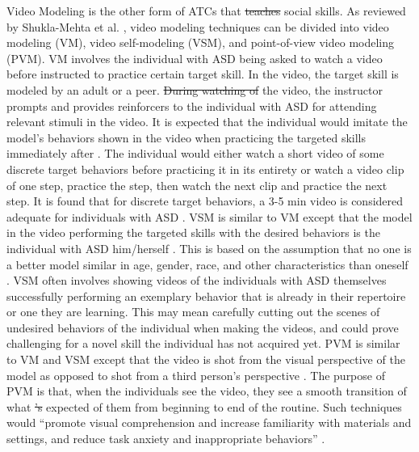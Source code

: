 \documentclass{ut-thesis}
\providecommand{\DIFaddtex}[1]{{\protect\color{blue}\uwave{#1}}} %
\providecommand{\DIFdeltex}[1]{{\protect\color{red}\sout{#1}}}                      %
\providecommand{\DIFaddbegin}{} %
\providecommand{\DIFaddend}{} %
\providecommand{\DIFdelbegin}{} %
\providecommand{\DIFdelend}{} %
\providecommand{\DIFadd}[1]{\texorpdfstring{\DIFaddtex{#1}}{#1}} %
\providecommand{\DIFdel}[1]{\texorpdfstring{\DIFdeltex{#1}}{}} %
\begin{document}
Video Modeling is the other form of ATCs that \DIFdelbegin \DIFdel{teaches }\DIFdelend \DIFaddbegin \DIFadd{teach }\DIFaddend social skills.  As reviewed by Shukla-Mehta et al. \cite{shukla2009evaluating}, video modeling techniques can be divided into video modeling (VM), video self-modeling (VSM), and point-of-view video modeling (PVM).  VM involves the individual with ASD being asked to watch a video before instructed to practice certain target skill.  In the video, the target skill is modeled by an adult or a peer.  \DIFdelbegin \DIFdel{During watching of }\DIFdelend \DIFaddbegin \DIFadd{While watching }\DIFaddend the video, the instructor prompts and provides reinforcers to the individual with ASD for attending relevant stimuli in the video.  It is expected that the individual would imitate the model's behaviors shown in the video when practicing the targeted skills immediately after \cite{bellini2007meta, graetz2006show}.  The individual would either watch a short video of some discrete target behaviors before practicing it in its entirety or watch a video clip of one step, practice the step, then watch the next clip and practice the next step.  It is found that for discrete target behaviors, a 3-5 min video is considered adequate for individuals with ASD \cite{buggey2005video}.  VSM is similar to VM except that the model in the video performing the targeted skills with the desired behaviors is the individual with ASD him/herself \cite{hitchcock2003video}.  This is based on the assumption that no one is a better model similar in age, gender, race, and other characteristics than oneself \cite{bandura1969principles, buggey1999training}.  VSM often involves showing videos of the individuals with ASD themselves successfully performing an exemplary behavior that is already in their repertoire or one they are learning.  This may mean carefully cutting out the scenes of undesired behaviors of the individual when making the videos, and could prove challenging for a novel skill the individual has not acquired yet.  PVM is similar to VM and VSM except that the video is shot from the visual perspective of the model as opposed to shot from a third person's perspective \cite{hine2006using}.  The purpose of PVM is that, when the individuals see the video, they see a smooth transition of what \DIFdelbegin \DIFdel{'s }\DIFdelend \DIFaddbegin \DIFadd{is }\DIFaddend expected of them from beginning to end of the routine.  Such techniques would ``promote visual comprehension and increase familiarity with materials and settings, and reduce task anxiety and inappropriate behaviors'' \cite{shukla2009evaluating}.
\end{document}
